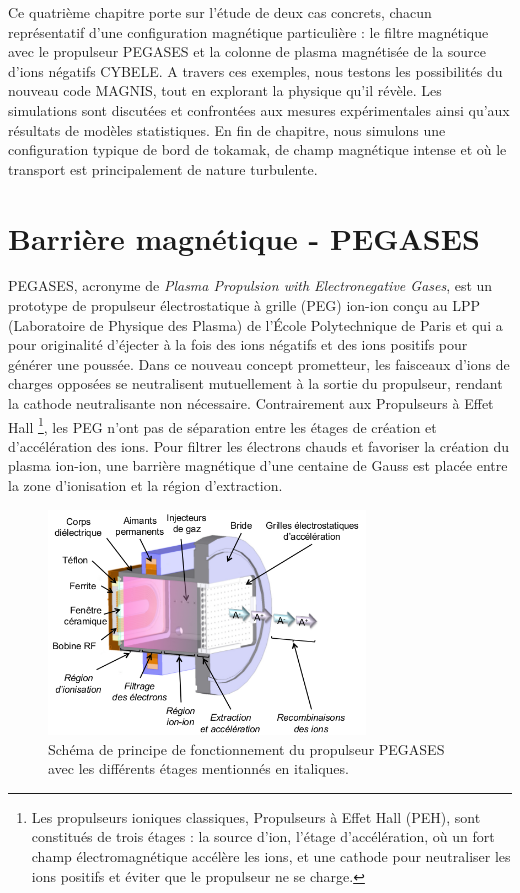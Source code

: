 \begin{refsection}
Ce quatrième chapitre porte sur l'étude de deux cas concrets,
chacun représentatif d'une configuration magnétique particulière : le filtre
magnétique avec le propulseur PEGASES et la colonne de plasma magnétisée de la
source d'ions négatifs CYBELE. 
A travers ces exemples, nous testons les possibilités du nouveau code MAGNIS,
tout en explorant la physique qu'il révèle. Les simulations sont discutées et
confrontées aux mesures expérimentales ainsi qu'aux résultats de modèles
statistiques.
En fin de chapitre, nous simulons une configuration typique de bord de tokamak,
de champ magnétique intense et où le transport est principalement de nature
turbulente. 
		 
\section{Barrière magnétique - PEGASES}
PEGASES, acronyme de \emph{Plasma Propulsion with Electronegative Gases}, est
un prototype de propulseur électrostatique à grille (PEG)
ion-ion\parencite{Chabert} conçu au LPP (Laboratoire de Physique des
Plasma) de l'École Polytechnique de Paris et qui a pour originalité d'éjecter à
la fois des ions négatifs et des ions positifs pour générer une poussée. Dans ce
nouveau concept prometteur, les faisceaux d'ions de charges opposées se
neutralisent mutuellement à la sortie du propulseur, rendant la cathode
neutralisante non nécessaire. Contrairement aux Propulseurs à Effet Hall
\footnote{Les propulseurs ioniques classiques, Propulseurs à Effet Hall (PEH),
sont constitués de trois étages : la source d'ion, l'étage d'accélération, où un
fort champ électromagnétique accélère les ions, et une cathode pour neutraliser
les ions positifs et éviter que le propulseur ne se charge.}, les PEG n'ont
pas de séparation entre les étages de création et d'accélération des ions.
Pour filtrer les électrons chauds et favoriser la création du plasma ion-ion, une
barrière magnétique d'une centaine de Gauss est placée entre la zone
d'ionisation et la région d'extraction.

\begin{figure}[!htbp]
\centering
\includegraphics[width=0.75\textwidth]{figures/4-pegases3D.png}
{\caption{Schéma de principe de fonctionnement du propulseur PEGASES avec les
différents étages mentionnés en italiques\parencite{Popelier}.}
\label{4-pegases3D}}
\end{figure}


\end{refsection}

